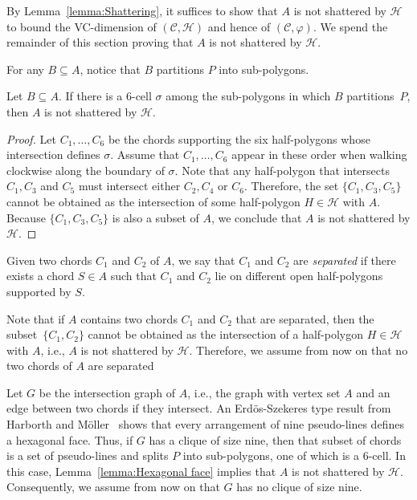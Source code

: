 \documentclass[a4paper,UKenglish]{lipics}
\begin{document}
By Lemma~\ref{lemma:Shattering}, it suffices to show that $A$ is not shattered by $\mathcal H$ to bound the VC-dimension of $(\mathcal C, \mathcal H)$ and hence of $(\mathcal C, \varphi)$.
We spend the remainder of this section proving that $A$ is not shattered by $\mathcal H$.

For any $B\subseteq A$, notice that $B$ partitions $P$ into sub-polygons. 

\begin{lemma}\label{lemma:Hexagonal face}
Let $B\subseteq A$. 
If there is a $6$-cell $\sigma$ among the sub-polygons in which $B$ partitions~$P$,
then $A$ is not shattered by $\mathcal H$.
\end{lemma}
\begin{proof}
Let $C_1, \ldots, C_6$ be the chords supporting the six half-polygons whose intersection defines $\sigma$. Assume that $C_1, \ldots, C_6$ appear in these order when walking clockwise along the boundary of $\sigma$.
Note that any half-polygon that intersects $C_1, C_3$ and $C_5$ must intersect either $C_2, C_4$ or $C_6$. 
Therefore, the set $\{C_1, C_3, C_5\}$ cannot be obtained as the intersection of some half-polygon $H\in \mathcal H$ with $A$. 
Because $\{C_1, C_3, C_5\}$ is also a subset of $A$, 
we conclude that $A$ is not shattered by $\mathcal H$.
\end{proof}

Given two chords $C_1$ and $C_2$ of $A$, we say that $C_1$ and $C_2$ are \emph{separated} if there exists a chord $S\in A$ such that $C_1$ and $C_2$ lie on different open half-polygons supported by $S$.

Note that if $A$ contains two chords $C_1$ and $C_2$ that are separated, then the subset~$\{C_1, C_2\}$ cannot be obtained as the intersection of a half-polygon $H\in \mathcal H$ with $A$, i.e., $A$ is not shattered by $\mathcal H$. 
Therefore, we assume from now on that no two chords of $A$ are separated

Let $G$ be the intersection graph of $A$, i.e., the graph with vertex set $A$ and an edge between two chords if they intersect. An Erd\"os-Szekeres type result from Harborth and M\"oller~\cite{harborth1993esther} shows that every arrangement of nine pseudo-lines defines a hexagonal face.
Thus, if $G$ has a clique of size nine, then that subset of chords is a set of pseudo-lines and splits $P$ into sub-polygons, one of which is a $6$-cell. 
In this case, Lemma~\ref{lemma:Hexagonal face} implies that $A$ is not shattered by $\mathcal H$.
Consequently, we assume from now on that $G$ has no clique of size nine. 
\end{document}
